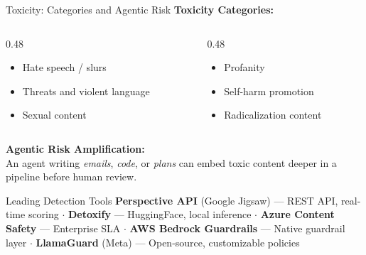 \documentclass{beamer}       %
\begin{document}
\begin{frame}{Toxicity: Categories and Agentic Risk}
    \small
    \textbf{Toxicity Categories:}
    \begin{columns}[T]
        \begin{column}{0.48\textwidth}
            \begin{itemize}
                \item Hate speech / slurs
                \item Threats and violent language
                \item Sexual content
            \end{itemize}
        \end{column}
        \begin{column}{0.48\textwidth}
            \begin{itemize}
                \item Profanity
                \item Self-harm promotion
                \item Radicalization content
            \end{itemize}
        \end{column}
    \end{columns}
    \vspace{0.3cm}
    \textbf{Agentic Risk Amplification:} \\
    An agent writing \textit{emails}, \textit{code}, or \textit{plans} can embed toxic content deeper in a pipeline before human review.
    \vfill
    \begin{block}{Leading Detection Tools}
        \footnotesize
        \textbf{Perspective API} (Google Jigsaw) --- REST API, real-time scoring $\cdot$
        \textbf{Detoxify} --- HuggingFace, local inference $\cdot$
        \textbf{Azure Content Safety} --- Enterprise SLA $\cdot$
        \textbf{AWS Bedrock Guardrails} --- Native guardrail layer $\cdot$
        \textbf{LlamaGuard} (Meta) --- Open-source, customizable policies
    \end{block}
\end{frame}
\end{document}
